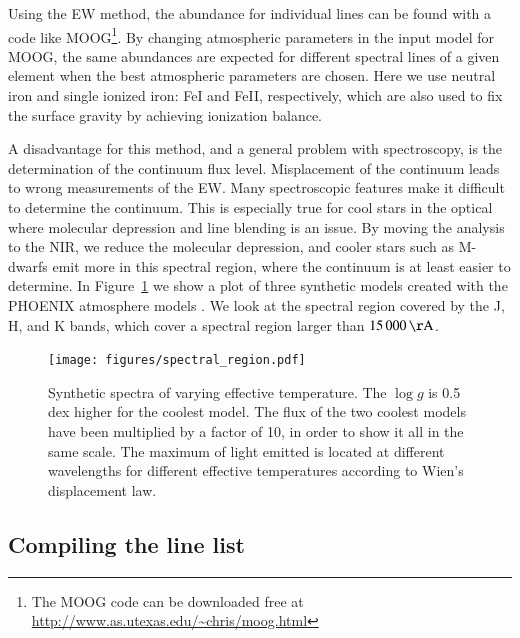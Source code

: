 \documentclass{aa}
\begin{document}
Using the EW method, the abundance for individual lines can be found
with a code like MOOG\footnote{The MOOG code can be downloaded free
at \url{http://www.as.utexas.edu/~chris/moog.html}}. By changing
atmospheric parameters in the input model for MOOG, the same abundances
are expected for different spectral lines of a given element when the
best atmospheric parameters are chosen. Here we use neutral iron and
single ionized iron: FeI and FeII, respectively, which are also used to
fix the surface gravity by achieving ionization balance.

A disadvantage for this method, and a general problem with spectroscopy,
is the determination of the continuum flux level. Misplacement of the
continuum leads to wrong measurements of the EW. Many spectroscopic
features make it difficult to determine the continuum. This is
especially true for cool stars in the optical where molecular depression
and line blending is an issue. By moving the analysis to the NIR, we
reduce the molecular depression, and cooler stars such as M-dwarfs
emit more in this spectral region, where the continuum is at least
easier to determine. In Figure~\ref{fig:spectral_region} we show a
plot of three synthetic models created with the PHOENIX atmosphere
models \citep{Husser2013}. We look at the spectral region covered
by the J, H, and K bands, which cover a spectral region larger than
$\SI{15000}{\AA}$.

\begin{figure}[tbp!]
    \centering
    \texttt{[image: figures/spectral\_region.pdf]}
    \caption{Synthetic spectra of varying effective temperature. The $\log g$
    is 0.5 dex higher for the coolest model. The flux of the two coolest models
    have been multiplied by a factor of 10, in order to show it all in the same
    scale. The maximum of light emitted is located at different wavelengths for
    different effective temperatures according to Wien's displacement law.}
    \label{fig:spectral_region}
\end{figure}




\subsection{Compiling the line list}
\end{document}
